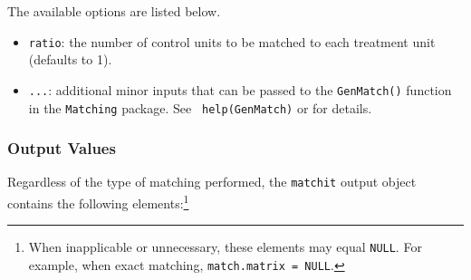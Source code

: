 The available options are listed below.
\begin{itemize}
\item {\tt ratio}: the number of control units to be matched to each
  treatment unit (defaults to 1).
\item {\tt ...}: additional minor inputs that can be passed to the
  {\tt GenMatch()} function in the {\tt Matching} package. See {\tt
    help(GenMatch)} or
  for details.
\end{itemize}

\subsubsection{Output Values}
\label{sec:outputs}

Regardless of the type of matching performed, the \texttt{matchit}
output object contains the following elements:\footnote{When
  inapplicable or unnecessary, these elements may equal {\tt NULL}.
  For example, when exact matching, {\tt match.matrix = NULL}.}

